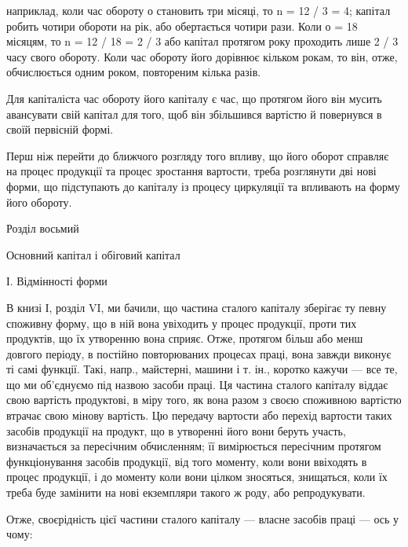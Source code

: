 \parcont{}  %
наприклад, коли час обороту о становить три місяці, то n = 12 / 3 = 4; капітал
робить чотири обороти на рік, або обертається чотири рази.
Коли о = 18 місяцям, то n = 12 / 18 = 2 / 3 або капітал протягом року проходить
лише 2 / 3 часу свого обороту. Коли час обороту його дорівнює кільком
рокам, то він, отже, обчислюється одним роком, повтореним кілька
разів.

Для капіталіста час обороту його капіталу є час, що протягом його він
мусить авансувати свій капітал для того, щоб він збільшився вартістю
й повернувся в своїй первісній формі.

Перш ніж перейти до ближчого розгляду того впливу, що його
оборот справляє на процес продукції та процес зростання вартости, треба
розглянути дві нові форми, що підступають до капіталу із процесу циркуляції
та впливають на форму його обороту.

Розділ восьмий

Основний капітал і обіговий капітал

І. Відмінності форми

В книзі І, розділ VI, ми бачили, що частина сталого капіталу зберігає
ту певну споживну форму, що в ній вона увіходить у процес
продукції, проти тих продуктів, що їх утворенню вона сприяє. Отже,
протягом більш або менш довгого періоду, в постійно повторюваних
процесах праці, вона завжди виконує ті самі функції. Такі, напр., майстерні,
машини і т. ін., коротко кажучи — все те, що ми об’єднуємо
під назвою засоби праці. Ця частина сталого капіталу віддає свою
вартість продуктові, в міру того, як вона разом з своєю споживною
вартістю втрачає свою мінову вартість. Цю передачу вартости або перехід
вартости таких засобів продукції на продукт, що в утворенні його
вони беруть участь, визначається за пересічним обчисленням; її вимірюється
пересічним протягом функціонування засобів продукції, від
того моменту, коли вони ввіходять в процес продукції, і до моменту
коли вони цілком зносяться, знищаться, коли їх треба буде замінити на
нові екземпляри такого ж роду, або репродукувати.

Отже, своєрідність цієї частини сталого капіталу — власне засобів
праці — ось у чому:

